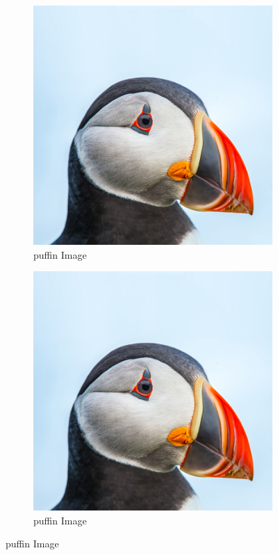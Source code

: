\begin{figure} [H]
    \begin{subfigure}[b]{.45\linewidth}
        \includegraphics[width=\linewidth]{puffin}
        \caption{puffin Image}\label{fig:puffin4}
    \end{subfigure}
    \begin{subfigure}[b]{.45\linewidth}
        \includegraphics[width=\linewidth]{puffin}
        \caption{puffin Image}\label{fig:puffin5}
    \end{subfigure}


\end{figure}
